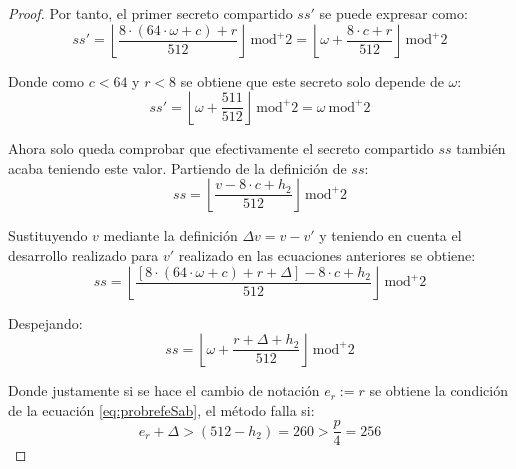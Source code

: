 \begin{proof}
	Por tanto, el primer secreto compartido \(ss'\) se puede expresar como:
	\begin{equation}
		ss'=\left\lfloor \dfrac{8\cdot (64\cdot \omega+c)+r}{512} \right\rfloor \ \text{mod}^{+}{2}=\left\lfloor \omega +\dfrac{8\cdot c+r}{512} \right\rfloor \ \text{mod}^{+}{2}
	\end{equation}
	
	Donde como \(c < 64\) y \(r < 8\) se obtiene que este secreto solo depende de $\omega$:
	\begin{equation}
		ss'=\left\lfloor \omega +\dfrac{511}{512} \right\rfloor \ \text{mod}^{+}{2}= \omega \ \text{mod}^{+}{2}
	\end{equation}
	
	Ahora solo queda comprobar que efectivamente el secreto compartido \(ss\) también acaba teniendo este valor. Partiendo de la definición de \(ss\):
	\begin{equation}
		ss=\left\lfloor \dfrac{v-8\cdot c+ h_2}{512}\right\rfloor \ \text{mod}^{+}{2}
	\end{equation}
	
	Sustituyendo \(v\) mediante la definición $\Delta v= v - v'$ y teniendo en cuenta el desarrollo realizado para \(v'\) realizado en las ecuaciones anteriores se obtiene:
	\begin{equation}
		ss=\left\lfloor \dfrac{[8\cdot(64\cdot \omega+c)+r+\Delta]-8\cdot c+ h_2}{512}\right\rfloor \ \text{mod}^{+}{2}
	\end{equation}
	
	Despejando:
	\begin{equation}
		ss=\left\lfloor \omega +\dfrac{r+\Delta+ h_2}{512}\right\rfloor \ \text{mod}^{+}{2}
	\end{equation}
	
	Donde justamente si se hace el cambio de notación \(e_r:=r\) se obtiene la condición de la ecuación \ref{eq:probrefeSab}, el método falla si:
	\begin{equation}
		e_r+\Delta > (512-h_2)= 260 >\dfrac{p}{4}=256
	\end{equation}
\end{proof}
\newpage

